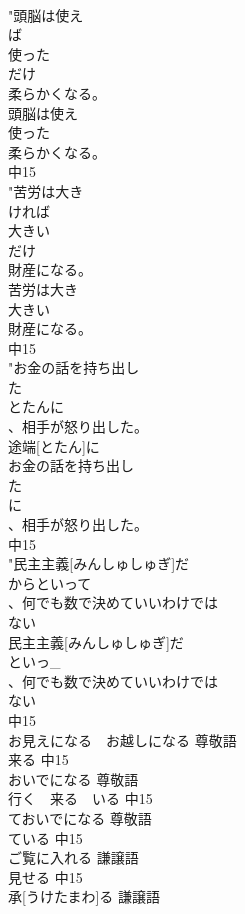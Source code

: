 \documentclass[8pt]{extreport}
\begin{document}
\begin{CJK}{UTF8}{min}
\\	"頭脳は使え
\\	ば
\\	使った
\\	だけ
\\	柔らかくなる。
\\	頭脳は使え
\\	使った
\\	柔らかくなる。
\\	中15
\\	"苦労は大き
\\	ければ
\\	大きい
\\	だけ
\\	財産になる。
\\	苦労は大き
\\	大きい
\\	財産になる。
\\	中15
\\	"お金の話を持ち出し
\\	た
\\	とたんに
\\	、相手が怒り出した。　
\\	途端[とたん]に
\\	お金の話を持ち出し
\\	た
\\	に
\\	、相手が怒り出した。
\\	中15
\\	"民主主義[みんしゅしゅぎ]だ
\\	からといって
\\	、何でも数で決めていいわけでは
\\	ない
\\	民主主義[みんしゅしゅぎ]だ
\\	といっ_
\\	、何でも数で決めていいわけでは
\\	ない
\\	中15
\\	お見えになる　お越しになる	尊敬語　 
\\	来る			中15
\\	おいでになる	尊敬語　 
\\	行く　来る　いる			中15
\\	ておいでになる	尊敬語　 
\\	ている			中15
\\	ご覧に入れる	謙譲語　
\\	見せる			中15
\\	承[うけたまわ]る	謙譲語　

\end{CJK}
\end{document}

